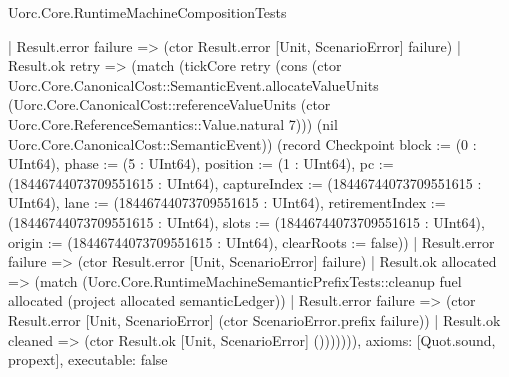 \begin{lexlean}{Uorc.Core.RuntimeMachineCompositionTests}
\begin{semanticmodule}
{        | Result.error failure => (ctor Result.error [Unit, ScenarioError] failure)
        | Result.ok retry => (match (tickCore retry (cons (ctor Uorc.Core.CanonicalCost::SemanticEvent.allocateValueUnits (Uorc.Core.CanonicalCost::referenceValueUnits (ctor Uorc.Core.ReferenceSemantics::Value.natural 7))) (nil Uorc.Core.CanonicalCost::SemanticEvent)) (record Checkpoint {block := (0 : UInt64), phase := (5 : UInt64), position := (1 : UInt64), pc := (18446744073709551615 : UInt64), captureIndex := (18446744073709551615 : UInt64), lane := (18446744073709551615 : UInt64), retirementIndex := (18446744073709551615 : UInt64), slots := (18446744073709551615 : UInt64), origin := (18446744073709551615 : UInt64), clearRoots := false}))
          | Result.error failure => (ctor Result.error [Unit, ScenarioError] failure)
          | Result.ok allocated => (match (Uorc.Core.RuntimeMachineSemanticPrefixTests::cleanup fuel allocated (project allocated semanticLedger))
            | Result.error failure => (ctor Result.error [Unit, ScenarioError] (ctor ScenarioError.prefix failure))
            | Result.ok cleaned => (ctor Result.ok [Unit, ScenarioError] ())))))),
  axioms: [Quot.sound, propext],
  executable: false
}


\end{semanticmodule}
\end{lexlean}
